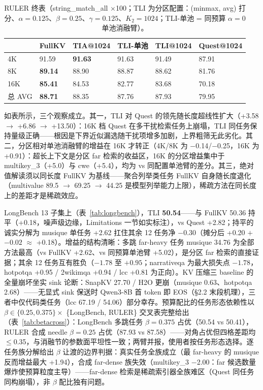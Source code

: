 \documentclass[11pt]{article}
\begin{document}
\begin{table}[h]\centering
\caption{RULER 终表（string\_match\_all $\times$100；TLI 为分区配置：(minmax, avg) 打分、$\alpha{=}0.125$、$\beta{=}0.25$、$\gamma{=}0.125$、$K_2{=}1024$；TLI-单池 = 同预算 $\alpha{=}0$ 单池消融臂）。}
\begin{tabular}{llllll}
\toprule
 & FullKV & TIA@1024 & TLI-单池 & TLI@1024 & Quest@1024 \\
\midrule
4K & 91.59 & \textbf{91.63} & 91.63 & 91.49 & 87.91 \\
8K & \textbf{89.14} & 88.90 & 88.87 & 88.62 & 81.76 \\
16K & \textbf{85.41} & 84.53 & 82.77 & 83.68 & 70.18 \\
总 AVG & \textbf{88.71} & 88.35 & 87.76 & 87.93 & 79.95 \\
\bottomrule
\end{tabular}
\end{table}

如表所示，三个观察成立。其一，TLI 对 Quest 的领先随长度超线性扩大（+3.58 $\rightarrow$ +6.86 $\rightarrow$ +13.50）：16K 档 Quest 在多干扰检索任务上崩塌，TLI 同任务保持量级正确——根因是下界近似漏选随干扰项增多加剧，上界粗筛无此劣化。其二，分区相对单池消融臂的增益在 16K 才转正（4K/8K 为 $-$0.14/$-$0.25，16K 为 +0.91）：超长上下文是分区 far 检索的收益区，16K 的分区增益集中于 multikey\_3（+5.0）与 cwe（+5.4），均为 vs 同配置单池臂的差分。其三，绝对值解读须以同长度 FullKV 为基线——聚合列举类任务 FullKV 自身随长度退化（multivalue 89.5 $\rightarrow$ 69.25 $\rightarrow$ 44.25 是模型列举能力上限），稀疏方法在同长度上的差距才是稀疏效应。

LongBench 13 子集上（表~\ref{tab:longbench}），TLI \textbf{50.54}——与 FullKV 50.36 持平（+0.18，噪声级边缘，Limitations 一节如实标注），vs Quest +2.82；持平的诚实分解为 musique 单任务 +2.62 扛住其余 12 任务净 $-0.30$（摊分后 +0.20 $+$ $-0.02$ $\approx$ +0.18）。增益的结构清晰：多跳 far-heavy 任务 musique 34.76 为全部方法最高（vs FullKV +2.62、vs 同预算单池臂 +5.02），是分区 far 检索的直接证据；其余 12 任务互有胜负（$-1.78$ 至 $+0.95$；narrativeqa 为最大损失点 $-1.78$，hotpotqa +0.95 / 2wikimqa +0.94 / lcc +0.81 为正向）。KV 压缩三 baseline 的全量崩坏坐实 sink 论断：SnapKV 27.70 / H2O 更崩（musique 0.63、hotpotqa 2.68）——无显式 sink 保送时 Qwen3-8B 首 token 即 EOS（§2.2 末段机理），三者中仅代码类任务（lcc 67.19 / 54.06）部分幸存。预算配比的任务形态依赖性以 $\beta \in \{0.25, 0.375\} \times$ \{LongBench, RULER\} 交叉表完整给出（表~\ref{tab:betacross}）：LongBench 多跳任务 $\beta{=}0.375$ 占优（50.54 vs 50.41），RULER 合成 needle $\beta{=}0.25$ 占优（87.93 vs 87.58）——对角占优但四格差距均 $\le$0.35，与消融节的参数面平坦性一致；两臂并报，使用者按任务形态选择。逐任务族分解给出 $\beta$ 让渡的边界判据：真实任务全族成立（最 far-heavy 的 musique 反而增益最大 +1.94），合成 far-dense 族失效（multikey\_3 $-$2.00：far 候选数量爆炸使预算粒度主导）——far-dense 检索是稀疏索引器全族难区（Quest 同任务同构崩塌），非 $\beta$ 配比独有问题。
\end{document}
